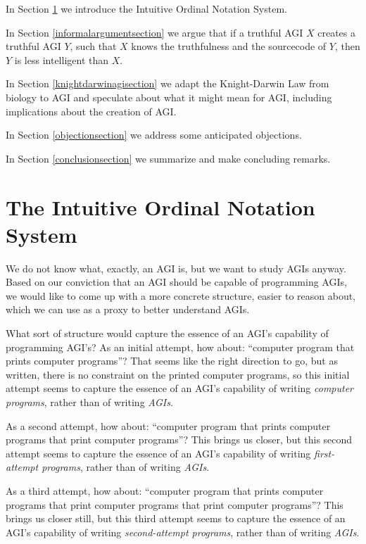 \documentclass[runningheads]{llncs}
\begin{document}
In Section \ref{notationsystemsection} we introduce the Intuitive Ordinal Notation
System.

In Section \ref{informalargumentsection} we argue that if a truthful AGI $X$ creates
a truthful AGI $Y$, such that $X$
knows the truthfulness and the sourcecode of $Y$, then $Y$ is less intelligent
than $X$.

In Section \ref{knightdarwinagisection} we adapt the Knight-Darwin Law from biology to AGI
and speculate about what it might mean for AGI, including implications about
the creation of AGI.

In Section \ref{objectionsection} we address some anticipated objections.

In Section \ref{conclusionsection} we summarize and make concluding remarks.


\section{The Intuitive Ordinal Notation System}
\label{notationsystemsection}

We do not know what, exactly, an AGI is, but we want to study AGIs anyway.
Based on our conviction that an AGI should be capable of programming AGIs,
we would like to come up with a more concrete structure, easier to reason
about, which we can use as a proxy to better understand AGIs.

What sort of structure would capture the essence of an AGI's capability
of programming AGI's? As an initial attempt, how about: ``computer
program that prints computer programs''? That seems like the right direction
to go, but as written, there is no constraint on the printed computer programs, so
this initial attempt seems to capture the essence of an
AGI's capability of writing \emph{computer programs}, rather than of writing \emph{AGIs}.

As a second attempt, how
about: ``computer program that prints computer programs that print
computer programs''? This brings us closer, but this second attempt
seems to capture the essence of an AGI's capability of writing \emph{first-attempt programs},
rather than of writing \emph{AGIs}.

As a third attempt, how about:
``computer program that prints computer programs that print computer programs
that print computer programs''? This brings us closer still, but this third
attempt seems to capture the essence of an AGI's capability of writing
\emph{second-attempt programs}, rather than of
writing \emph{AGIs}.
\end{document}
